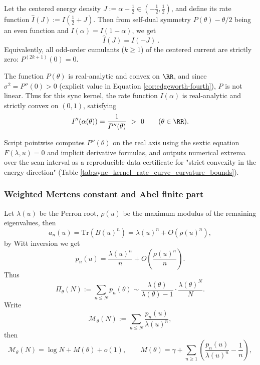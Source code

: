 \begin{proposition}\label{prop:fluctuation-even}
Let the centered energy density \(J:=\alpha-\tfrac12\in(-\tfrac12,\tfrac12)\), and define its rate function
\(
\widehat I(J):=I(\tfrac12+J)
\).
Then from self-dual symmetry \(P(\theta)-\theta/2\) being an even function and \(I(\alpha)=I(1-\alpha)\), we get
\[
\boxed{\ \widehat I(J)=\widehat I(-J)\ }.
\]
Equivalently, all odd-order cumulants (\(k\ge 1\)) of the centered current are strictly zero: \(P^{(2k+1)}(0)=0\).
\end{proposition}

\begin{proposition}\label{prop:rate-strict-convex}
The function \(P(\theta)\) is real-analytic and convex on \(\RR\), and since \(\sigma^2=P''(0)>0\) (explicit value in Equation \eqref{cor:edgeworth-fourth}), \(P\) is not linear.
Thus for this sync kernel, the rate function \(I(\alpha)\) is real-analytic and strictly convex on \((0,1)\), satisfying
\[
I''(\alpha(\theta))=\frac{1}{P''(\theta)}\ >\ 0\qquad(\theta\in\RR).
\]
\end{proposition}
\begin{remark}\label{rem:rate-curvature-bounds}
Script  pointwise computes \(P''(\theta)\) on the real axis using the sextic equation \(F(\lambda,u)=0\) and implicit derivative formulas, and outputs numerical extrema over the scan interval as a reproducible data certificate for "strict convexity in the energy direction" (Table \ref{tab:sync_kernel_rate_curve_curvature_bounds}).
\end{remark}


\subsubsection{Weighted Mertens constant and Abel finite part}\label{app:mertens-weighted}
Let $\lambda(u)$ be the Perron root, $\rho(u)$ be the maximum modulus of the remaining eigenvalues, then
\[
a_n(u)=\mathrm{Tr}(B(u)^n)=\lambda(u)^n+O(\rho(u)^n),
\]
by Witt inversion we get
\[
p_n(u)=\frac{\lambda(u)^n}{n}+O\!\left(\frac{\rho(u)^n}{n}\right).
\]
Thus
\[
\Pi_\theta(N):=\sum_{n\le N}p_n(\theta)\sim \frac{\lambda(\theta)}{\lambda(\theta)-1}\cdot\frac{\lambda(\theta)^N}{N}.
\]
Write
\[
\mathcal{M}_\theta(N):=\sum_{n\le N}\frac{p_n(u)}{\lambda(u)^n},
\]
then
\[
\mathcal{M}_\theta(N)=\log N+M(\theta)+o(1),
\qquad
M(\theta)=\gamma+\sum_{n\ge 1}\left(\frac{p_n(u)}{\lambda(u)^n}-\frac{1}{n}\right),
\]

